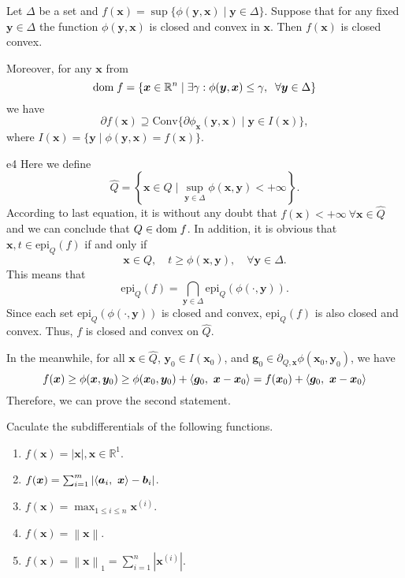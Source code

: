 \documentclass{article}
\newcommand{\RBB}{\mathbb{R}}
\newcommand{\xB}{\bm{x}}
\newcommand{\yB}{\bm{y}}
\newcommand{\gB}{\bm{g}}
\newcommand{\aB}{\bm{a}}
\newcommand{\bB}{\bm{b}}
\newcommand{\domf}{\textrm{dom\;}f}
\newcommand{\normgen}[1]{\left\| #1 \right\|}
\newcommand{\normone}[1]{\left\| #1 \right\|_1}
\begin{document}
\begin{excercise}\label{e4}
	Let $\Delta$ be a set and $f(\xB) = \sup \{ \phi (\yB,\xB) \mid \yB \in \Delta \}$. Suppose that for any fixed $\yB \in \Delta$ the function $\phi (\yB, \xB)$ is closed and convex in $\xB$. Then $f(\xB)$ is closed convex.
	
	Moreover, for any $\xB$ from
	\begin{equation}
		\domf = \{ \xB \in \RBB^n \mid \exists \gamma : \phi (\yB,\xB) \leq \gamma, \;\; \forall \yB \in \Delta \}\nonumber
	\end{equation}
	we have
	\begin{equation}
		\partial f(\xB) \supseteq \textrm{Conv} \{ \partial \phi_{\xB} (\yB, \xB) \mid \yB \in I(\xB) \},\nonumber
	\end{equation}
	where $I(\xB) = \{\yB \mid \phi(\yB, \xB) = f(\xB)\}$.
\end{excercise}

\begin{PROOF}{e4}
	Here we define 
	\[
		\hat{Q} = \left\{ \xB \in Q \mid \sup_{\yB \in \Delta} \phi(\xB, \yB) < +\infty \right\}.	
	\]
	According to last equation, it is without any doubt that \(f(\xB) < +\infty~\forall \xB \in \hat{Q}\) and we can conclude that \(Q \in \domf\). 
	In addition, it is obvious that \(\xB, t \in \mathrm{epi}_Q(f)\) if and only if
	\[
		\xB \in Q, \quad t \ge \phi(\xB, \yB), \quad \forall \yB \in \Delta.	
	\]
	This means that 
	\[
		\mathrm{epi}_Q(f) = \bigcap_{\yB \in \Delta} \mathrm{epi}_Q(\phi(\cdot, \yB)).	
	\]
	Since each set \(\mathrm{epi}_Q(\phi(\cdot, \yB))\) is closed and convex, \(\mathrm{epi}_Q(f)\) is also closed and convex. Thus, \(f\) is closed and convex on \(\hat{Q}\).

	In the meanwhile, for all \(\xB \in \hat{Q}\), \(\yB_0 \in I(\xB_0)\), and \(\gB_0 \in \partial_{Q,\xB} \phi(\xB_0, \yB_0)\), we have
	\[
		f(\xB) \ge \phi(\xB, \yB_0) \ge \phi(\xB_0, \yB_0) + \innerproduct{\gB_0}{\xB - \xB_0} = f(\xB_0) +  \innerproduct{\gB_0}{\xB - \xB_0}	
	\]
	Therefore, we can prove the second statement.
\end{PROOF}

\begin{excercise}\label{e5}
Caculate the subdifferentials of the following functions.
\begin{enumerate}
	\item $f(\xB) = |\xB|, \xB \in \RBB^1$.
	\item $f(\xB) = \sum_{i=1}^{m} | \innerproduct{\aB_i}{\xB} - \bB_i|$.
	\item $f(\xB) = \max_{1 \leq i \leq n} \xB^{(i)}$.
	\item $f(\xB) = \normgen{\xB}$.
	\item $f(\xB) = \normone{\xB} = \sum_{i=1}^{n} |\xB^{(i)}|$.
\end{enumerate}
\end{excercise}
\end{document}
